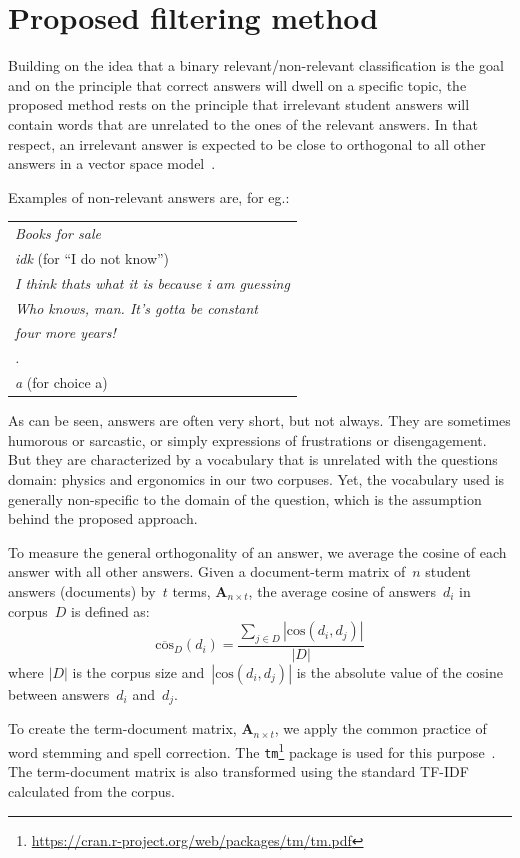 \documentclass{edm_template}
\begin{document}
\section{Proposed filtering method}

Building on the idea that a binary relevant/non-relevant classification is the goal and on the principle that correct answers will dwell on a specific topic, the proposed method rests on the principle that irrelevant student answers will contain words that are unrelated to the ones of the relevant answers.  In that respect, an irrelevant answer is expected to be close to orthogonal to all other answers in a vector space model~\cite{turney2010frequency}.

Examples of non-relevant answers are, for eg.:

\begin{tabular}{|l|}
\hline
\textit{Books for sale}\tabularnewline
\textit{idk} (for ``I do not know'')\tabularnewline
\textit{I think thats what it is because i am guessing}\tabularnewline
\textit{Who knows, man. It's gotta be constant}\tabularnewline
\textit{four more years!}\tabularnewline
\textit{.}\tabularnewline
\textit{a} (for choice a)\tabularnewline
\hline
\end{tabular}

As can be seen, answers are often very short, but not always. They are sometimes humorous or sarcastic, or simply expressions of frustrations or disengagement.  But they are characterized by a vocabulary that is unrelated with the questions domain: physics and ergonomics in our two corpuses. Yet, the vocabulary used is generally non-specific to the domain of the question, which is the assumption behind the proposed approach.

To measure the general orthogonality of an answer, we average the cosine of each answer with all other answers.  Given a document-term matrix of~$n$ student answers (documents) by~$t$ terms, $\mathbf{A}_{n \times t}$, the average cosine of answers~$d_i$ in corpus~$D$ is defined as:
\[ \overline{\textrm{cos}}_D(d_i) = \frac{\sum_{j \in D} |\textrm{cos}(d_i, d_j)|}{|D|} \]
where $|D|$ is the corpus size and~$|\textrm{cos}(d_i, d_j)|$ is the absolute value of the cosine between answers~$d_i$ and~$d_j$.

To create the term-document matrix, $\mathbf{A}_{n \times t}$, we apply the common practice of word stemming and spell correction.  The \texttt{tm}\footnote{\url{https://cran.r-project.org/web/packages/tm/tm.pdf}} package is used for this purpose~\cite{nemeth2011hunspello}. The term-document matrix is also transformed using the standard TF-IDF calculated from the corpus.  
\end{document}
